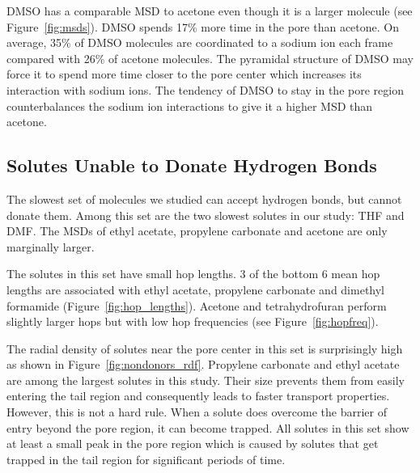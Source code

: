 \documentclass[journal=jpcbfk,manuscript=article]{achemso}
\begin{document}
  DMSO has a comparable MSD to acetone even though it is a larger molecule
  (see Figure~\ref{fig:msds}). DMSO spends 17\% more time in the pore than acetone. 
  On average, 35\% of DMSO molecules are coordinated to a sodium ion each
  frame compared with 26\% of acetone molecules. The pyramidal structure 
  of DMSO may force it to spend more time closer to the pore center which
  increases its interaction with sodium ions. The tendency of DMSO to stay
  in the pore region counterbalances the sodium ion interactions to give it
  a higher MSD than acetone. 
  
  \subsection{Solutes Unable to Donate Hydrogen Bonds}  %

  The slowest set of molecules we studied can accept hydrogen bonds, but
  cannot donate them. Among this set are the two slowest solutes in our study: 
  THF and DMF. The MSDs of ethyl acetate, propylene carbonate and acetone are
  only marginally larger.
  
  The solutes in this set have small hop lengths. 3 of the bottom 6 mean hop
  lengths are associated with ethyl acetate, propylene carbonate and
  dimethyl formamide (Figure~\ref{fig:hop_lengths}). Acetone and 
  tetrahydrofuran perform slightly larger hops but with low hop frequencies
  (see Figure~\ref{fig:hopfreq}).
  
  The radial density of solutes near the pore center in this set is 
  surprisingly high as shown in Figure~\ref{fig:nondonors_rdf}. Propylene
  carbonate and ethyl acetate are among the largest solutes in this study. 
  Their size prevents them from easily entering the tail region and 
  consequently leads to faster transport properties.  %
  However, this is not a hard rule. When a solute does overcome the 
  barrier of entry beyond the pore region, it can become trapped. All
  solutes in this set show at least a small peak in the pore region which
  is caused by solutes that get trapped in the tail region for 
  significant periods of time.
    
  
\end{document}

